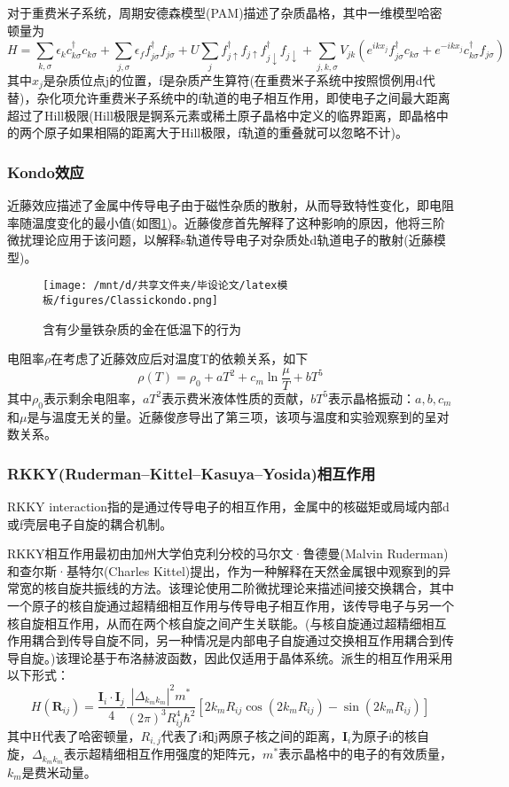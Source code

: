 对于重费米子系统，周期安德森模型(PAM)描述了杂质晶格，其中一维模型哈密顿量为
$$
H=\sum_{k, \sigma} \epsilon_{k} c_{k \sigma}^{\dagger} c_{k \sigma}+\sum_{j, \sigma} \epsilon_{f} f_{j \sigma}^{\dagger} f_{j \sigma}+U \sum_{j} f_{j \uparrow}^{\dagger} f_{j \uparrow} f_{j \downarrow}^{\dagger} f_{j \downarrow}+\sum_{j, k, \sigma} V_{j k}\left(e^{i k x_{j}} f_{j \sigma}^{\dagger} c_{k \sigma}+e^{-i k x_{j}} c_{k \sigma}^{\dagger} f_{j \sigma}\right)
$$
其中$x_j$是杂质位点j的位置，f是杂质产生算符(在重费米子系统中按照惯例用d代替)，杂化项允许重费米子系统中的f轨道的电子相互作用，即使电子之间最大距离超过了Hill极限(Hill极限是锕系元素或稀土原子晶格中定义的临界距离，即晶格中的两个原子如果相隔的距离大于Hill极限，f轨道的重叠就可以忽略不计)。%

\subsubsection{Kondo效应}
近藤效应描述了金属中传导电子由于磁性杂质的散射，从而导致特性变化，即电阻率随温度变化的最小值(如图\ref{fig})。近藤俊彦首先解释了这种影响的原因，他将三阶微扰理论应用于该问题，以解释s轨道传导电子对杂质处d轨道电子的散射(近藤模型)。
\begin{figure}[h]
    \centering
    \texttt{[image: /mnt/d/共享文件夹/毕设论文/latex模板/figures/Classickondo.png]}
    \caption{含有少量铁杂质的金在低温下的行为\cite{10}}
    \label{fig}
\end{figure}
电阻率$\rho$在考虑了近藤效应后对温度T的依赖关系，如下
$$
\rho(T)=\rho_{0}+a T^{2}+c_{m} \ln \frac{\mu}{T}+b T^{5}
$$
其中$\rho_0$表示剩余电阻率，$aT^2$表示费米液体性质的贡献，$bT^5$表示晶格振动：$a,b,c_m$和$\mu$是与温度无关的量。近藤俊彦导出了第三项，该项与温度和实验观察到的呈对数关系。


\subsubsection{RKKY(Ruderman–Kittel–Kasuya–Yosida)相互作用}
RKKY interaction指的是通过传导电子的相互作用，金属中的核磁矩或局域内部d或f壳层电子自旋的耦合机制。

RKKY相互作用最初由加州大学伯克利分校的马尔文·鲁德曼(Malvin Ruderman)和查尔斯·基特尔(Charles Kittel)提出，作为一种解释在天然金属银中观察到的异常宽的核自旋共振线的方法。该理论使用二阶微扰理论来描述间接交换耦合，其中一个原子的核自旋通过超精细相互作用与传导电子相互作用，该传导电子与另一个核自旋相互作用，从而在两个核自旋之间产生关联能。(与核自旋通过超精细相互作用耦合到传导自旋不同，另一种情况是内部电子自旋通过交换相互作用耦合到传导自旋。)该理论基于布洛赫波函数，因此仅适用于晶体系统。派生的相互作用采用以下形式：
$$
H\left(\mathbf{R}_{i j}\right)=\frac{\mathbf{I}_{i} \cdot \mathbf{I}_{j}}{4} \frac{\left|\Delta_{k_{m} k_{m}}\right|^{2} m^{*}}{(2 \pi)^{3} R_{i j}^{4} \hbar^2}\left[2 k_{m} R_{i j} \cos \left(2 k_{m} R_{i j}\right)-\sin \left(2 k_{m} R_{i j}\right)\right]
$$
其中H代表了哈密顿量，$R_{i,j}$代表了i和j两原子核之间的距离，$\mathbf{I}_i$为原子i的核自旋，$\Delta_{k_{m}k_m}$表示超精细相互作用强度的矩阵元，$m^*$表示晶格中的电子的有效质量，$k_m$是费米动量。 







